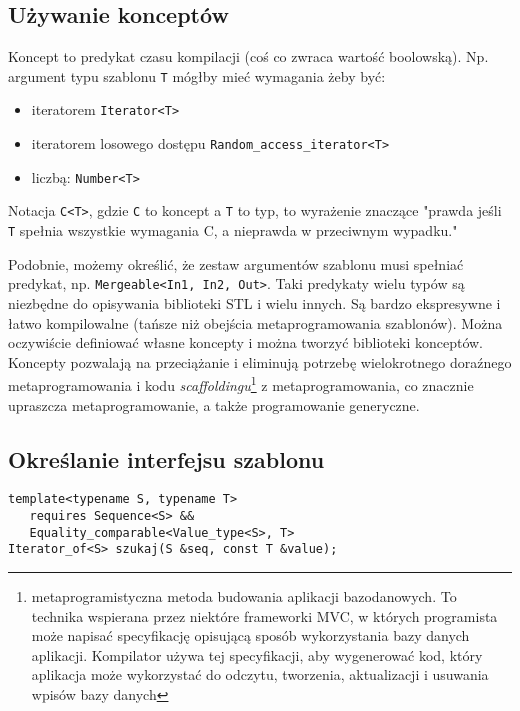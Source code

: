 \documentclass[11pt, a4paper]{article}
\begin{document}
\subsection{Używanie konceptów}

Koncept to predykat czasu kompilacji (coś co zwraca wartość boolowską). Np. argument typu szablonu \verb#T# mógłby mieć wymagania żeby być:

\begin{itemize}

\item iteratorem \verb#Iterator<T>#

\item iteratorem losowego dostępu \verb#Random_access_iterator<T>#

\item liczbą: \verb#Number<T>#

\end{itemize}

Notacja \verb#C<T>#, gdzie \verb#C# to koncept a \verb#T# to typ, to wyrażenie znaczące "prawda jeśli \verb#T# spełnia wszystkie wymagania C, a nieprawda w przeciwnym wypadku."

Podobnie, możemy określić, że zestaw argumentów szablonu musi spełniać predykat, np. \verb#Mergeable<In1, In2, Out>#. Taki predykaty wielu typów są niezbędne do opisywania biblioteki STL i wielu innych. Są bardzo ekspresywne i łatwo kompilowalne (tańsze niż obejścia metaprogramowania szablonów). Można oczywiście definiować własne koncepty i można tworzyć biblioteki konceptów. Koncepty pozwalają na przeciążanie i eliminują potrzebę wielokrotnego doraźnego metaprogramowania i kodu \emph{scaffoldingu}\footnote{metaprogramistyczna metoda budowania aplikacji bazodanowych. To technika wspierana przez niektóre frameworki MVC, w których programista może napisać specyfikację opisującą sposób wykorzystania bazy danych aplikacji. Kompilator używa tej specyfikacji, aby wygenerować kod, który aplikacja może wykorzystać do odczytu, tworzenia, aktualizacji i usuwania wpisów bazy danych } z metaprogramowania, co znacznie upraszcza metaprogramowanie, a także programowanie generyczne.

\subsection{Określanie interfejsu szablonu}

\begin{lstlisting}[frame=single]
template<typename S, typename T>
   requires Sequence<S> && 
   Equality_comparable<Value_type<S>, T>
Iterator_of<S> szukaj(S &seq, const T &value);
\end{lstlisting}
\end{document}
